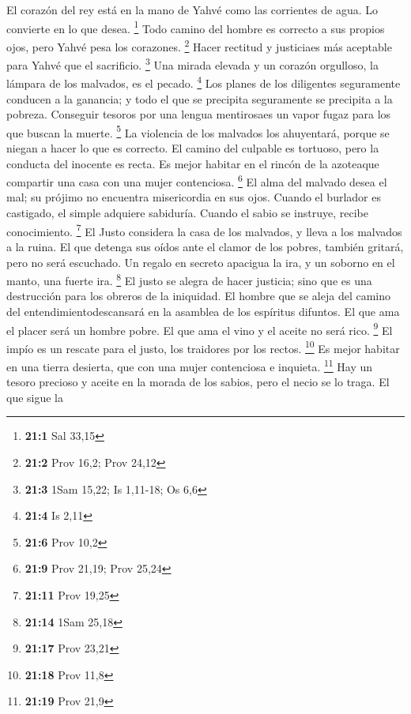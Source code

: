  El corazón del rey está en la mano de Yahvé como las
corrientes de agua. Lo convierte en lo que desea. \footnote{\textbf{21:1}
  Sal 33,15}  Todo camino del hombre es correcto a sus
propios ojos, pero Yahvé pesa los corazones. \footnote{\textbf{21:2}
  Prov 16,2; Prov 24,12}  Hacer rectitud y justiciaes más
aceptable para Yahvé que el sacrificio. \footnote{\textbf{21:3} 1Sam
  15,22; Is 1,11-18; Os 6,6}  Una mirada elevada y un
corazón orgulloso, la lámpara de los malvados, es el pecado. \footnote{\textbf{21:4}
  Is 2,11}  Los planes de los diligentes seguramente
conducen a la ganancia; y todo el que se precipita seguramente se
precipita a la pobreza.  Conseguir tesoros por una lengua
mentirosaes un vapor fugaz para los que buscan la muerte. \footnote{\textbf{21:6}
  Prov 10,2}  La violencia de los malvados los ahuyentará,
porque se niegan a hacer lo que es correcto.  El camino
del culpable es tortuoso, pero la conducta del inocente es recta.
 Es mejor habitar en el rincón de la azoteaque compartir
una casa con una mujer contenciosa. \footnote{\textbf{21:9} Prov 21,19;
  Prov 25,24}  El alma del malvado desea el mal; su
prójimo no encuentra misericordia en sus ojos.  Cuando el
burlador es castigado, el simple adquiere sabiduría. Cuando el sabio se
instruye, recibe conocimiento. \footnote{\textbf{21:11} Prov 19,25}
 El Justo considera la casa de los malvados, y lleva a
los malvados a la ruina.  El que detenga sus oídos ante
el clamor de los pobres, también gritará, pero no será escuchado.
 Un regalo en secreto apacigua la ira, y un soborno en el
manto, una fuerte ira. \footnote{\textbf{21:14} 1Sam 25,18}
 El justo se alegra de hacer justicia; sino que es una
destrucción para los obreros de la iniquidad.  El hombre
que se aleja del camino del entendimientodescansará en la asamblea de
los espíritus difuntos.  El que ama el placer será un
hombre pobre. El que ama el vino y el aceite no será rico. \footnote{\textbf{21:17}
  Prov 23,21}  El impío es un rescate para el justo, los
traidores por los rectos. \footnote{\textbf{21:18} Prov 11,8}
 Es mejor habitar en una tierra desierta, que con una
mujer contenciosa e inquieta. \footnote{\textbf{21:19} Prov 21,9}
 Hay un tesoro precioso y aceite en la morada de los
sabios, pero el necio se lo traga.  El que sigue la
